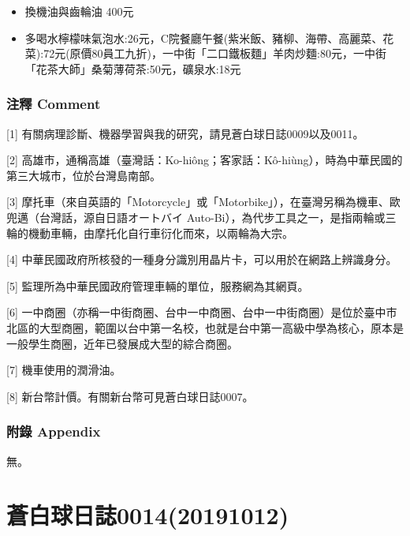 \documentclass[a5paper, 12pt
]{book}
\providecommand{\tightlist}{%
  \setlength{\itemsep}{0pt}\setlength{\parskip}{0pt}}
\begin{document}
\begin{enumerate}
  \begin{itemize}
  \tightlist
  \item
    換機油與齒輪油 400元
  \item
    多喝水檸檬味氣泡水:26元，C院餐廳午餐(紫米飯、豬柳、海帶、高麗菜、花菜):72元(原價80員工九折)，一中街「二口鐵板麵」羊肉炒麵:80元，一中街「花茶大師」桑菊薄荷茶:50元，礦泉水:18元
  \end{itemize}
\end{enumerate}

\hypertarget{ux6ce8ux91cb-comment-6}{%
\subsubsection{注釋 Comment}\label{ux6ce8ux91cb-comment-6}}

{[}1{]} 有關病理診斷、機器學習與我的研究，請見蒼白球日誌0009以及0011。

{[}2{]}
高雄市，通稱高雄（臺灣話：Ko-hiông；客家話：Kô-hiùng），時為中華民國的第三大城市，位於台灣島南部。

{[}3{]}
摩托車（來自英語的「Motorcycle」或「Motorbike」），在臺灣另稱為機車、歐兜邁（台灣話，源自日語オートバイ
Auto-Bi），為代步工具之一，是指兩輪或三輪的機動車輛，由摩托化自行車衍化而來，以兩輪為大宗。

{[}4{]}
中華民國政府所核發的一種身分識別用晶片卡，可以用於在網路上辨識身分。

{[}5{]} 監理所為中華民國政府管理車輛的單位，服務網為其網頁。

{[}6{]}
一中商圈（亦稱一中街商圈、台中一中商圈、台中一中街商圈）是位於臺中市北區的大型商圈，範圍以台中第一名校，也就是台中第一高級中學為核心，原本是一般學生商圈，近年已發展成大型的綜合商圈。

{[}7{]} 機車使用的潤滑油。

{[}8{]} 新台幣計價。有關新台幣可見蒼白球日誌0007。

\hypertarget{ux9644ux9304-appendix-5}{%
\subsubsection{附錄 Appendix}\label{ux9644ux9304-appendix-5}}

無。

\hypertarget{ux84bcux767dux7403ux65e5ux8a8c001420191012}{%
\section{蒼白球日誌0014(20191012)}\label{ux84bcux767dux7403ux65e5ux8a8c001420191012}}
\end{document}
